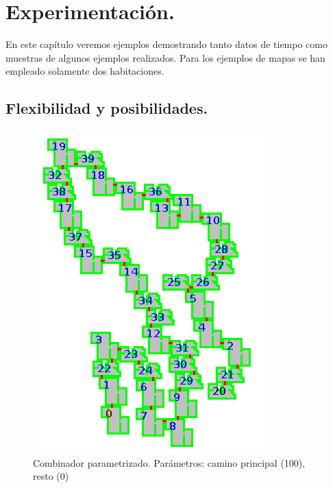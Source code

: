 \chapter{Experimentación.}\label{cap:capitulo7}

En este capítulo veremos ejemplos demostrando tanto datos de tiempo como muestras de algunos ejemplos realizados. Para los ejemplos de mapas se han empleado solamente dos habitaciones.

\section{Flexibilidad y posibilidades.}

\begin{figure}[H]
\centering
\includegraphics[scale=1]{img/mapsamples/mainpath}
\caption{Combinador parametrizado. Parámetros: camino principal (100), resto (0)
\label{fig:grfmainpath}}
\end{figure}


